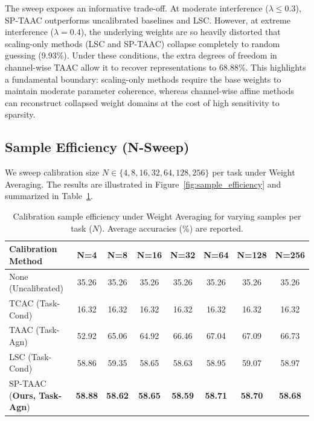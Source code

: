 \documentclass{article}
\theoremstyle{plain}
\theoremstyle{definition}
\theoremstyle{remark}
\begin{document}
The sweep exposes an informative trade-off. At moderate interference ($\lambda \le 0.3$), SP-TAAC outperforms uncalibrated baselines and LSC. However, at extreme interference ($\lambda = 0.4$), the underlying weights are so heavily distorted that scaling-only methods (LSC and SP-TAAC) collapse completely to random guessing (9.93\%). Under these conditions, the extra degrees of freedom in channel-wise TAAC allow it to recover representations to 68.88\%. This highlights a fundamental boundary: scaling-only methods require the base weights to maintain moderate parameter coherence, whereas channel-wise affine methods can reconstruct collapsed weight domains at the cost of high sensitivity to sparsity.

\subsection{Sample Efficiency (N-Sweep)}
We sweep calibration size $N \in \{4, 8, 16, 32, 64, 128, 256\}$ per task under Weight Averaging. The results are illustrated in Figure~\ref{fig:sample_efficiency} and summarized in Table~\ref{tab:sample_efficiency}.

\begin{table}[t]
\caption{Calibration sample efficiency under Weight Averaging for varying samples per task ($N$). Average accuracies (\%) are reported.}
\label{tab:sample_efficiency}
\begin{center}
\begin{tabular}{lccccccc}
\toprule
\textbf{Calibration Method} & \textbf{N=4} & \textbf{N=8} & \textbf{N=16} & \textbf{N=32} & \textbf{N=64} & \textbf{N=128} & \textbf{N=256} \\
\midrule
None (Uncalibrated) & 35.26 & 35.26 & 35.26 & 35.26 & 35.26 & 35.26 & 35.26 \\
TCAC (Task-Cond) & 16.32 & 16.32 & 16.32 & 16.32 & 16.32 & 16.32 & 16.32 \\
TAAC (Task-Agn) & 52.92 & 65.06 & 64.92 & 66.46 & 67.04 & 67.09 & 66.73 \\
LSC (Task-Cond) & 58.86 & 59.35 & 58.65 & 58.63 & 58.95 & 59.07 & 58.97 \\
SP-TAAC (\textbf{Ours, Task-Agn}) & \textbf{58.88} & \textbf{58.62} & \textbf{58.65} & \textbf{58.59} & \textbf{58.71} & \textbf{58.70} & \textbf{58.68} \\
\bottomrule
\end{tabular}
\end{center}
\end{table}
\end{document}
